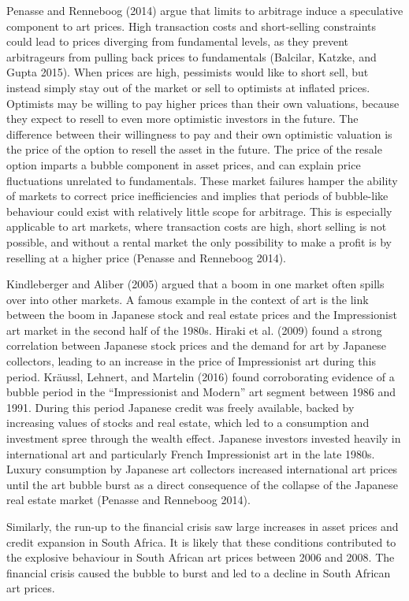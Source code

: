 \documentclass[]{elsarticle} %
\begin{document}
Penasse and Renneboog (2014) argue that limits to arbitrage induce a
speculative component to art prices. High transaction costs and
short-selling constraints could lead to prices diverging from
fundamental levels, as they prevent arbitrageurs from pulling back
prices to fundamentals (Balcilar, Katzke, and Gupta 2015). When prices
are high, pessimists would like to short sell, but instead simply stay
out of the market or sell to optimists at inflated prices. Optimists may
be willing to pay higher prices than their own valuations, because they
expect to resell to even more optimistic investors in the future. The
difference between their willingness to pay and their own optimistic
valuation is the price of the option to resell the asset in the future.
The price of the resale option imparts a bubble component in asset
prices, and can explain price fluctuations unrelated to fundamentals.
These market failures hamper the ability of markets to correct price
inefficiencies and implies that periods of bubble-like behaviour could
exist with relatively little scope for arbitrage. This is especially
applicable to art markets, where transaction costs are high, short
selling is not possible, and without a rental market the only
possibility to make a profit is by reselling at a higher price (Penasse
and Renneboog 2014).

Kindleberger and Aliber (2005) argued that a boom in one market often
spills over into other markets. A famous example in the context of art
is the link between the boom in Japanese stock and real estate prices
and the Impressionist art market in the second half of the 1980s. Hiraki
et al. (2009) found a strong correlation between Japanese stock prices
and the demand for art by Japanese collectors, leading to an increase in
the price of Impressionist art during this period. Kräussl, Lehnert, and
Martelin (2016) found corroborating evidence of a bubble period in the
``Impressionist and Modern'' art segment between 1986 and 1991. During
this period Japanese credit was freely available, backed by increasing
values of stocks and real estate, which led to a consumption and
investment spree through the wealth effect. Japanese investors invested
heavily in international art and particularly French Impressionist art
in the late 1980s. Luxury consumption by Japanese art collectors
increased international art prices until the art bubble burst as a
direct consequence of the collapse of the Japanese real estate market
(Penasse and Renneboog 2014).

Similarly, the run-up to the financial crisis saw large increases in
asset prices and credit expansion in South Africa. It is likely that
these conditions contributed to the explosive behaviour in South African
art prices between 2006 and 2008. The financial crisis caused the bubble
to burst and led to a decline in South African art prices.
\end{document}
